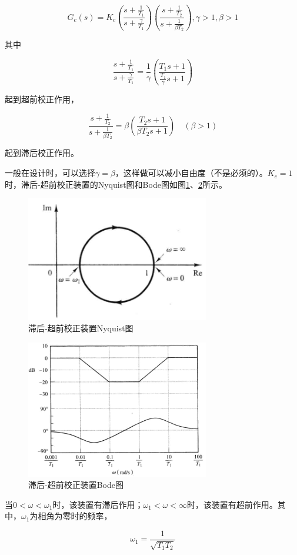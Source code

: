 \begin{equation*}
    G_{c}(s)=K_{c}\left(\frac{s+\frac{1}{T_{1}}}{s+\frac{\gamma}{T_{1}}}\right)\left(\frac{s+\frac{1}{T_{2}}}{s+\frac{1}{\beta T_{2}}}\right), \gamma>1, \beta>1
\end{equation*}

其中

\begin{equation*}
    \frac{s+\frac{1}{T_{1}}}{s+\frac{\gamma}{T_{1}}}=\frac{1}{\gamma}\left(\frac{T_{1} s+1}{\frac{T_{1}}{\gamma} s+1}\right)
\end{equation*}

起到超前校正作用，

\begin{equation*}
    \frac{s+\frac{1}{T_{2}}}{s+\frac{1}{\beta T_{2}}}=\beta\left(\frac{T_{2} s+1}{\beta T_{2} s+1}\right) \quad(\beta>1)
\end{equation*}

起到滞后校正作用。

一般在设计时，可以选择$\gamma=\beta$，这样做可以减小自由度（不是必须的）。$K_c=1$时，滞后-超前校正装置的Nyquist图和Bode图如图\ref{37}、\ref{38}所示。

\begin{figure}[!ht]
    \centering
    \includegraphics[width=8cm]{figures/37.png}
    \caption{滞后-超前校正装置Nyquist图}
    \label{37}
\end{figure}

\begin{figure}[!ht]
    \centering
    \includegraphics[width=8cm]{figures/38.png}
    \caption{滞后-超前校正装置Bode图}
    \label{38}
\end{figure}

当$0<\omega<\omega_1$时，该装置有滞后作用；$\omega_1<\omega<\infty$时，该装置有超前作用。其中，$\omega_1$为相角为零时的频率，

\begin{equation*}
    \omega_1=\frac{1}{\sqrt{T_1T_2}}
\end{equation*}